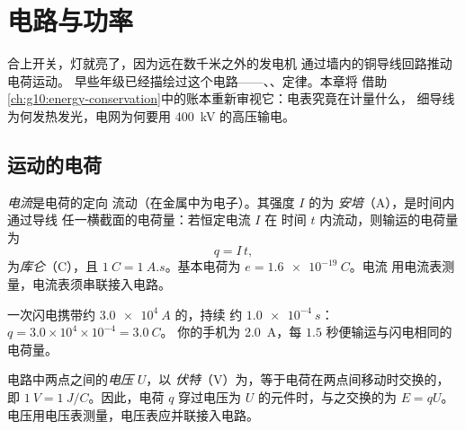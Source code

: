 \chapter{电路与功率}\label{ch:g11:circuits-and-power}

合上开关，灯就亮了，因为远在数千米之外的发电机
通过墙内的铜导线回路推动电荷运动。
早些年级已经描绘过这个电路——、、定律。本章将
借助\cref{ch:g10:energy-conservation}中的账本重新审视它：电表究竟在计量什么，
细导线为何发热发光，电网为何要用 \qty{400}{kV} 的高压输电。

\section{运动的电荷}

\begin{definition}[电流与库仑]\label{def:g11:circuits-and-power:current}
\emph{电流}是电荷的定向
流动（在金属中为电子）。其强度 $I$ 的为
\emph{安培}（\unit{A}），是时间内通过导线
任一横截面的电荷量：若恒定电流 $I$ 在
时间 $t$ 内流动，则输运的电荷量为
\[ q = I\,t , \]
为\emph{库仑}（\unit{C}），且 $\qty{1}{C} =
\qty{1}{A.s}$。基本电荷为 $e = \qty{1.6e-19}{C}$。电流
用电流表测量，电流表须串联接入电路。
\end{definition}

\begin{example}[闪电与手机]\label{ex:g11:circuits-and-power:coulomb}
一次闪电携带约 $\qty{3.0e4}{A}$ 的，持续
约 $\qty{1.0e-4}{s}$：$q = 3.0\times10^{4} \times 10^{-4} = \qty{3.0}{C}$。
你的手机为 \qty{2.0}{A}，每 $1.5$ 秒便输运与闪电相同的电荷量。
\end{example}

\begin{definition}[电压与伏特]\label{def:g11:circuits-and-power:voltage}
电路中两点之间的\emph{电压} $U$，以
\emph{伏特}（\unit{V}）为，等于电荷在两点间移动时交换的，即
$\qty{1}{V} = \qty{1}{J/C}$。因此，电荷
$q$ 穿过电压为 $U$ 的元件时，与之交换的为 $E = qU$。
电压用电压表测量，电压表应并联接入电路。
\end{definition}

